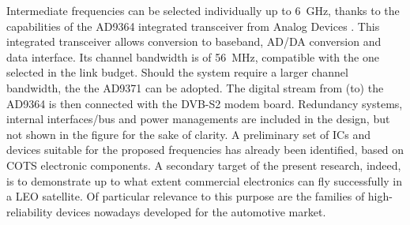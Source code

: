 \documentclass[conference,10pt,a4paper]{IEEEtran}%
\begin{document}
Intermediate frequencies can be selected individually up to 6~GHz, thanks to the capabilities of the AD9364 integrated transceiver from Analog Devices \cite{analog}.
This integrated transceiver allows conversion to baseband, AD/DA conversion and data interface.
Its channel bandwidth is of 56~MHz, compatible with the one selected in the link budget.
Should the system require a larger channel bandwidth, the the AD9371 can be adopted.
The digital stream from (to) the AD9364 is then connected with the DVB-S2 modem board.
Redundancy systems, internal interfaces/bus and power managements are included in the design, but not shown in the figure for the sake of clarity.
A preliminary set of ICs and devices suitable for the proposed frequencies has already been identified, based on COTS electronic components.
A secondary target of the present research, indeed, is to demonstrate up to what extent commercial electronics can fly successfully in a LEO satellite.
Of particular relevance to this purpose are the families of high-reliability devices nowadays developed for the automotive market.

\end{document}
